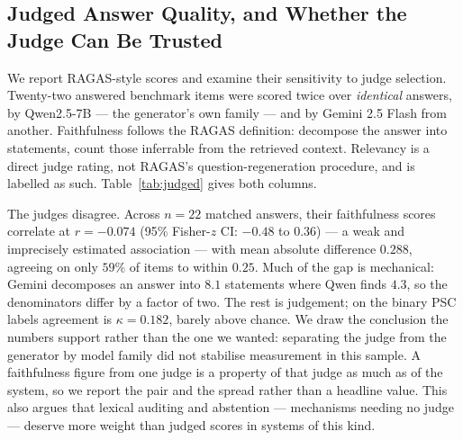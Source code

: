 \documentclass[conference]{IEEEtran}
\begin{document}
\subsection{Judged Answer Quality, and Whether the Judge Can Be Trusted}
\label{sec:judged}
We report RAGAS-style scores and examine their sensitivity to judge selection.
Twenty-two answered benchmark items were scored twice over \emph{identical}
answers, by Qwen2.5-7B --- the generator's own family --- and by Gemini 2.5
Flash from another. Faithfulness follows the RAGAS definition: decompose the
answer into statements, count those inferrable from the retrieved context.
Relevancy is a direct judge rating, not RAGAS's question-regeneration procedure,
and is labelled as such. Table~\ref{tab:judged} gives both columns.

The judges disagree. Across $n=22$ matched answers, their faithfulness scores
correlate at $r = -0.074$ (95\% Fisher-$z$ CI: $-0.48$ to $0.36$) --- a weak and
imprecisely estimated association --- with mean absolute difference $0.288$,
agreeing on only $59\%$ of items to within $0.25$. Much of the gap is
mechanical: Gemini decomposes an answer into $8.1$ statements where Qwen finds
$4.3$, so the denominators differ by a factor of two. The rest is judgement; on
the binary PSC labels agreement is $\kappa = 0.182$, barely above chance. We
draw the conclusion the numbers support rather than the one we wanted:
separating the judge from the generator by model family did not stabilise
measurement in this sample. A faithfulness figure from one judge is a property
of that judge as much as of the system, so we report the pair and the spread
rather than a headline value. This also argues that lexical auditing and
abstention --- mechanisms needing no judge --- deserve more weight than judged
scores in systems of this kind.
\end{document}
